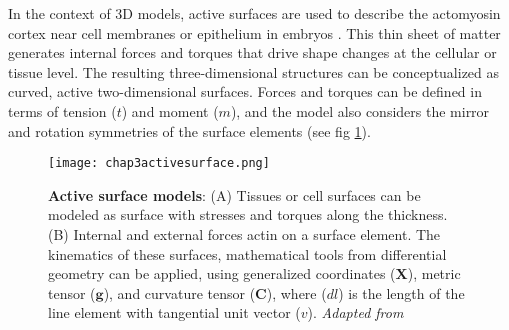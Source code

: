 In the context of 3D models, active surfaces are used to describe the actomyosin cortex near cell membranes or epithelium in embryos \cite{salbreux2017}. This thin sheet of matter generates internal forces and torques that drive shape changes at the cellular or tissue level. The resulting three-dimensional structures can be conceptualized as curved, active two-dimensional surfaces. Forces and torques can be defined in terms of tension (\(t\)) and moment (\(m\)), and the model also considers the mirror and rotation symmetries of the surface elements (see fig \ref{fig_3_9}).
%
%

\begin{figure}
	\begin{minipage}[c]{0.5\textwidth}
		\texttt{[image: chap3activesurface.png]}
	\end{minipage}\hfill
	\begin{minipage}[c]{0.45\textwidth}
		\caption{\textbf{Active surface models}: (A) Tissues or cell surfaces can be modeled as surface with stresses and torques along the thickness. (B) Internal and external forces actin on a surface element. The kinematics of these surfaces, mathematical tools from differential geometry can be applied, using generalized coordinates ($\mathbf{X}$), metric tensor ($\mathbf{g}$), and curvature tensor ($\mathbf{C}$), where ($dl$) is the length of the line element with tangential unit vector ($v$). \textit{Adapted from \cite{salbreux2017}}
		} \label{fig_3_9}
	\end{minipage}
\end{figure}






